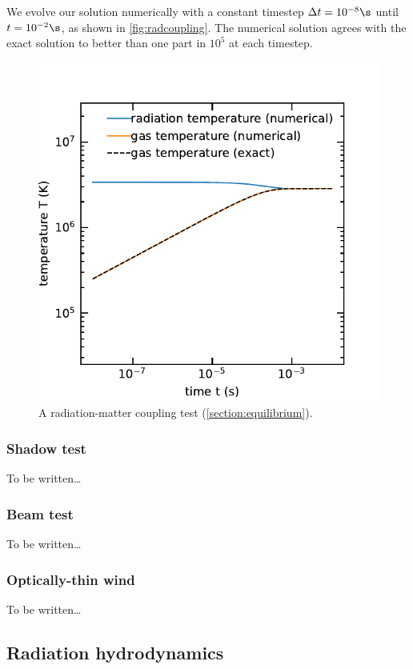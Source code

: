 \documentclass[fleqn,usenatbib]{mnras}
\begin{document}
We evolve our solution numerically with a constant timestep $\Delta t = 10^{-8} \s$ until $t = 10^{-2} \s$, as shown in \autoref{fig:radcoupling}. The numerical solution agrees with the exact solution to better than one part in $10^{5}$ at each timestep.
\begin{figure}
    \includegraphics[width=\columnwidth]{radcoupling.pdf}
    \caption{A radiation-matter coupling test (\autoref{section:equilibrium}).}
    \label{fig:radcoupling}
\end{figure}

\subsubsection{Shadow test}
To be written\dots

\subsubsection{Beam test}
To be written\dots

\subsubsection{Optically-thin wind}
To be written\dots

\subsection{Radiation hydrodynamics}
\label{ssec:radhydro_tests}
\end{document}
